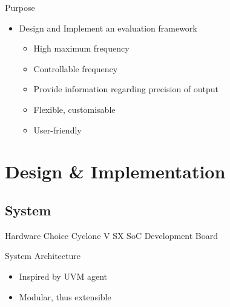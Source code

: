 \documentclass[t]{beamer}
\begin{document}
\begin{frame}{Purpose}
  \begin{itemize}
    \item Design and Implement an evaluation framework
    \begin{itemize}[<+->]
      \item High maximum frequency
      \item Controllable frequency
      \item Provide information regarding precision of output
      \item Flexible, customisable
      \item User-friendly
    \end{itemize}
  \end{itemize}
\end{frame}

\section[D\&I]{Design \& Implementation}
\subsection{System}

\begin{frame}{Hardware Choice}
  Cyclone V SX SoC Development Board
  \begin{figure}[H]
    \centering
  \end{figure}
\end{frame}

\begin{frame}{System Architecture}
  \begin{itemize}
    \item Inspired by UVM agent
    \item Modular, thus extensible
  \end{itemize}
  \begin{figure}[H]
    \centering
    \resizebox{0.8\textwidth}{!}{%
      
    }
  \end{figure}
\end{frame}
\end{document}
